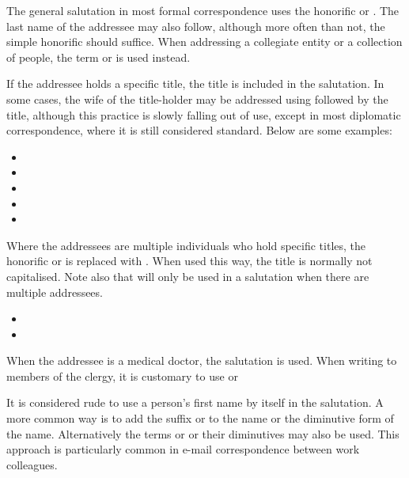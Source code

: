 The general salutation in most formal correspondence uses the honorific  or .
The last name of the addressee may also follow, although more often than not, the simple honorific 
should suffice. When addressing a collegiate entity or a collection of people, the term  or
 is used instead.

If the addressee holds a specific title, the title is included in the salutation. In some cases, the wife of the
title-holder may be addressed using  followed by the title, although this practice is slowly falling out
of use, except in most diplomatic correspondence, where it is still considered standard. Below are some examples:


\begin{itemize}[nosep]
	\item {}
	\item {}
	\item {}
	\item {}
	\item {}
\end{itemize}

Where the addressees are multiple individuals who hold specific titles, the honorific  or  is replaced with . When used this way, the title is normally not capitalised. Note also that  will only be used in a salutation when there are multiple addressees.

\begin{itemize}[nosep]
	\item {}
	\item {}
\end{itemize}

When the addressee is a medical doctor, the salutation  is used. When writing to members of the clergy, it is customary to use  or 

It is considered rude to use a person's first name by itself in the salutation. A more common way is to add the suffix  or  to the name or the diminutive form of the name. Alternatively the terms  or  or their diminutives may also be used. This approach is particularly common in e-mail correspondence between work colleagues.

